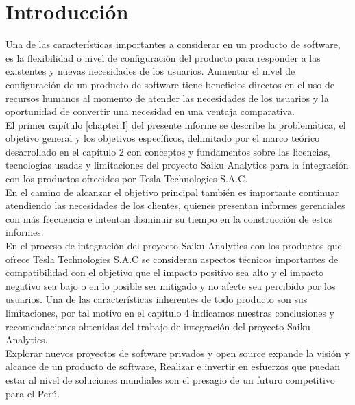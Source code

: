 \clearpage
{}
{}

\chapter*{Introducción}
\begin{spacing}{1.5}
	Una de las características importantes a considerar en un producto de software, es la flexibilidad o nivel de configuración del producto para responder a las existentes y nuevas necesidades de los usuarios. Aumentar el nivel de configuración de un producto de software tiene beneficios directos en el uso de recursos humanos al momento de atender las necesidades de los usuarios y la oportunidad de convertir una necesidad en una ventaja comparativa.\\
	El primer capítulo \ref{chapter:I} del presente informe se describe la problemática, el objetivo general y los objetivos específicos, delimitado por el marco teórico desarrollado en el capítulo 2 con conceptos y fundamentos sobre las licencias, tecnologías usadas y limitaciones del proyecto Saiku Analytics para la integración con los productos ofrecidos por Tesla Technologies S.A.C.\\
	En el camino de alcanzar el objetivo principal también es importante continuar atendiendo las necesidades de los clientes, quienes presentan informes gerenciales con más frecuencia e intentan disminuir su tiempo en la construcción de estos informes.\\
	En el proceso de integración del proyecto Saiku Analytics con los productos que ofrece Tesla Technologies S.A.C se consideran aspectos técnicos importantes de compatibilidad con el objetivo que el impacto positivo sea alto y el impacto negativo sea bajo o en lo posible ser mitigado y no afecte sea percibido por los usuarios. 
	Una de las características inherentes de todo producto son sus limitaciones, por tal motivo en el capítulo 4 indicamos nuestras conclusiones y recomendaciones obtenidas del trabajo de integración del proyecto Saiku Analytics.\\
	Explorar nuevos proyectos de software privados y open source expande la visión y alcance de un producto de software, Realizar e invertir en esfuerzos que puedan estar al nivel de soluciones mundiales son el presagio de un futuro competitivo para el Perú.\\
\end{spacing}
